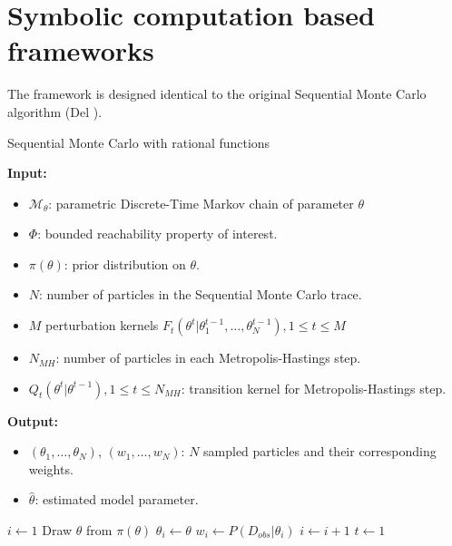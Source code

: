 \section{Symbolic computation based frameworks}
The framework is
designed identical to the original Sequential Monte Carlo algorithm (Del \cite{del2006sequential}).
\begin{algorithm}[H]
    \caption{Sequential Monte Carlo with rational functions}
    \label{alg:rf-smc}
    \footnotesize{
        \hspace*{\algorithmicindent} \textbf{Input:}
        \begin{itemize}[noitemsep,topsep=0pt]
            \item $\mathcal{M}_\theta$: parametric Discrete-Time Markov chain of parameter $\theta$
            \item $\Phi$: bounded reachability property of interest.
            \item $\pi(\theta)$: prior distribution on $\theta$.
            \item $N$: number of particles in the Sequential Monte Carlo trace.
            \item $M$ perturbation kernels $F_t(\theta^t | \theta^{t-1}_1,\ldots,\theta^{t-1}_N), 1\leq t \leq M$
            \item $N_{MH}$: number of particles in each Metropolis-Hastings step.
            \item $Q_t(\theta^t|\theta^{t-1}), 1 \leq t \leq N_{MH}$: transition kernel for Metropolis-Hastings step.
        \end{itemize}
        \hspace*{\algorithmicindent} \textbf{Output:}
        \begin{itemize}[noitemsep,topsep=0pt]
            \item $(\theta_1,\ldots,\theta_N)$, $(w_1,\ldots,w_N)$: $N$ sampled particles and their corresponding weights.
            \item $\hat{\theta}$: estimated model parameter.
        \end{itemize}
    }
    \begin{algorithmic}[1]
        \State $i \leftarrow 1$
         
        \State Draw $\theta$ from $\pi(\theta)$
        \State $\theta_i \leftarrow \theta$
        \State $w_i \leftarrow P(D_{obs}|\theta_i)$
        \State $i \leftarrow i + 1$
        \EndWhile
        \State $t \leftarrow 1$

\end{algorithmic}
\end{algorithm}

